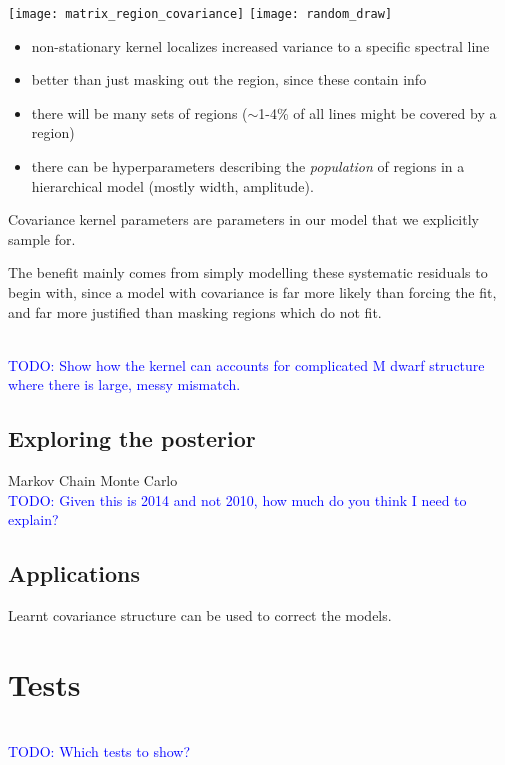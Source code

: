 \documentclass[preprint]{aastex} %
\newcommand{\todo}[1]{ \textcolor{Blue}{\\TODO: #1}}
\begin{document}
\begin{figure*}[!htb]
\begin{center}
\texttt{[image: matrix\_region\_covariance]}
\texttt{[image: random\_draw]}
\caption{\textbf{Left} a covariance matrix generated with the region kernel. \textbf{Right} general spectroscopic residuals near a mismatched stellar line overlaid with a sample draw using the covariance matrix, showing that the two look similar in structure and amplitude. \protect \todo{Similar improvements to Figure~\ref{fig:matern}.}}
\label{fig:region}
\end{center}
\end{figure*}

\begin{itemize}
  \item non-stationary kernel localizes increased variance to a specific spectral line
  \item better than just masking out the region, since these contain info
  \item there will be many sets of regions ($\sim$1-4\% of all lines might be covered by a region)
  \item there can be hyperparameters describing the \emph{population} of regions in a hierarchical model (mostly width, amplitude).
\end{itemize}

Covariance kernel parameters are parameters in our model that we explicitly sample for. 

The benefit mainly comes from simply modelling these systematic residuals to begin with, since a model with covariance is far more likely than forcing the fit, and far more justified than masking regions which do not fit.

\todo{Show how the kernel can accounts for complicated M dwarf structure where there is large, messy mismatch.}

\subsection{Exploring the posterior}
Markov Chain Monte Carlo
\todo{Given this is 2014 and not 2010, how much do you think I need to explain?}

\subsection{Applications}
Learnt covariance structure can be used to correct the models.

\section{Tests}
\todo{Which tests to show?}



\end{document}
